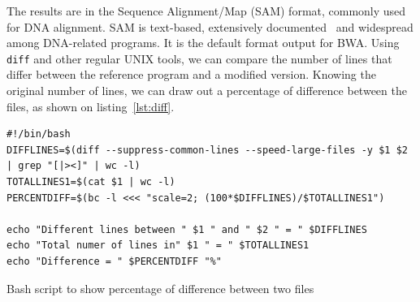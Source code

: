 The results are in the Sequence Alignment/Map (SAM) format, commonly used for DNA alignment. SAM is text-based, extensively documented~\cite{samtools:sam} and widespread among DNA-related programs. It is the default format output for BWA. Using \verb|diff| and other regular UNIX tools, we can compare the number of lines that differ between the reference program and a modified version. Knowing the original number of lines, we can draw out a percentage of difference between the files, as shown on listing~\ref{lst:diff}.

\begin{listing}[ht]
	\begin{verbatim}
#!/bin/bash
DIFFLINES=$(diff --suppress-common-lines --speed-large-files -y $1 $2 | grep "[|><]" | wc -l)
TOTALLINES1=$(cat $1 | wc -l)
PERCENTDIFF=$(bc -l <<< "scale=2; (100*$DIFFLINES)/$TOTALLINES1")

echo "Different lines between " $1 " and " $2 " = " $DIFFLINES
echo "Total numer of lines in" $1 " = " $TOTALLINES1
echo "Difference = " $PERCENTDIFF "%"
	\end{verbatim}
	\caption{Bash script to show percentage of difference between two files}
	\label{lst:diff}
\end{listing}


